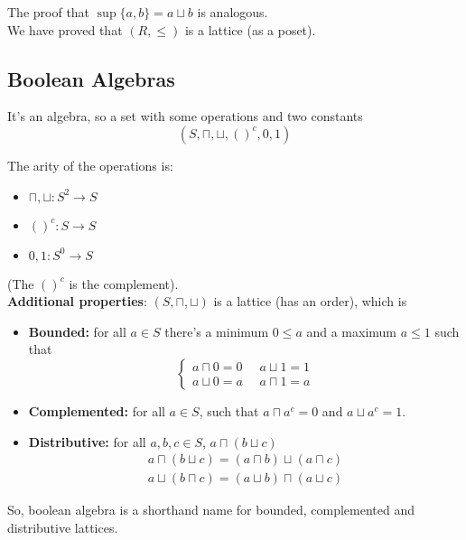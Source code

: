\documentclass[11pt]{article}
\begin{document}
	The proof that $\sup\{a,b\} = a \sqcup b$ is analogous.\\
	
	We have proved that $(R, \leq)$ is a lattice (as a poset).\\
	
	\newpage
	
	\subsection{Boolean Algebras}
	
	It's an algebra, so a set with some operations and two constants
	$$ (S, \sqcap, \sqcup, ()^c, 0, 1 ) $$
	
	The arity of the operations is:
	\begin{itemize}
		\item $\sqcap, \sqcup : S^2 \rightarrow S$
		\item $()^c: S \rightarrow S$
		\item $0,1: S^0 \rightarrow S$
	\end{itemize}
	(The $()^c$ is the complement).\\
	
	\textbf{Additional properties}: $(S, \sqcap, \sqcup)$ is a lattice (has an order), which is 
	\begin{itemize}
		\item \textbf{Bounded:} for all $a \in S$ there's a minimum $0 \leq a$ and a maximum $a \leq 1$ such that
		$$ \begin{cases}
			a \sqcap 0 = 0 \;\; &  a \sqcup 1  = 1 \\
			a \sqcup 0 = a & a \sqcap 1 = a
		\end{cases}$$
		\nn
		
		\item \textbf{Complemented:} for all $a \in S$, such that $a \sqcap a^c = 0$ and $a \sqcup a^c = 1$.\\
		
		\item \textbf{Distributive:} for all $a,b,c \in S$, $a \sqcap (b \sqcup c)$
		$$ \begin{array}{c}
			a \sqcap (b \sqcup c) = (a \sqcap b) \sqcup (a \sqcap c) \\
			a \sqcup (b \sqcap c) = (a \sqcup b) \sqcap (a \sqcup c)
		\end{array}$$
		\nn
	\end{itemize}
	
	So, boolean algebra is a shorthand name for bounded, complemented and distributive lattices.\\
	
\end{document}
